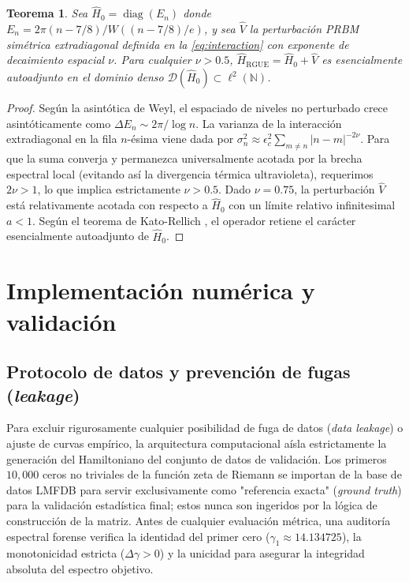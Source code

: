 \documentclass[aps,prl,preprint,superscriptaddress,floatfix]{revtex4-2}
\newtheorem{theorem}{Teorema}[section]
\newcommand{\N}{\mathbb{N}}
\begin{document}
\begin{theorem}
\label{thm:kato_rellich_prbm}
Sea $\hat{H}_0 = \operatorname{diag}(E_n)$ donde $E_n = 2\pi (n - 7/8) / W((n - 7/8)/e)$, y sea $\hat{V}$ la perturbación PRBM simétrica extradiagonal definida en la \cref{eq:interaction} con exponente de decaimiento espacial $\nu$. Para cualquier $\nu > 0.5$, $\hat{H}_{\text{RGUE}} = \hat{H}_0 + \hat{V}$ es esencialmente autoadjunto en el dominio denso $\mathcal{D}(\hat{H}_0) \subset \ell^2(\N)$.
\end{theorem}

\begin{proof}
Según la asintótica de Weyl, el espaciado de niveles no perturbado crece asintóticamente como $\Delta E_n \sim 2\pi / \log n$. La varianza de la interacción extradiagonal en la fila $n$-ésima viene dada por $\sigma_n^2 \approx \epsilon_c^2 \sum_{m \neq n} |n-m|^{-2\nu}$. Para que la suma converja y permanezca universalmente acotada por la brecha espectral local (evitando así la divergencia térmica ultravioleta), requerimos $2\nu > 1$, lo que implica estrictamente $\nu > 0.5$. Dado $\nu = 0.75$, la perturbación $\hat{V}$ está relativamente acotada con respecto a $\hat{H}_0$ con un límite relativo infinitesimal $a < 1$. Según el teorema de Kato-Rellich \cite{ReedSimon1975}, el operador retiene el carácter esencialmente autoadjunto de $\hat{H}_0$.
\end{proof}

\section{Implementación numérica y validación}

\subsection{Protocolo de datos y prevención de fugas (\textit{leakage})}
Para excluir rigurosamente cualquier posibilidad de fuga de datos (\textit{data leakage}) o ajuste de curvas empírico, la arquitectura computacional aísla estrictamente la generación del Hamiltoniano del conjunto de datos de validación. Los primeros $10,000$ ceros no triviales de la función zeta de Riemann se importan de la base de datos LMFDB \cite{LMFDB} para servir exclusivamente como "referencia exacta" (\textit{ground truth}) para la validación estadística final; estos nunca son ingeridos por la lógica de construcción de la matriz. Antes de cualquier evaluación métrica, una auditoría espectral forense verifica la identidad del primer cero ($\gamma_1 \approx 14.134725$), la monotonicidad estricta ($\Delta \gamma > 0$) y la unicidad para asegurar la integridad absoluta del espectro objetivo.
\end{document}
